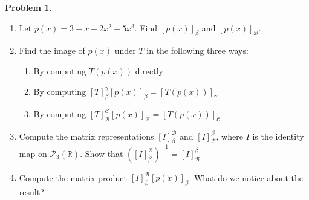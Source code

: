 \documentclass[10pt]{article}
\theoremstyle{definition}
\newtheorem{problem}{Problem}
\begin{document}
\begin{problem}
\begin{enumerate}[label=(\alph*)]
$$\begin{pmatrix}
            -2 & 3
          \end{pmatrix},
          \begin{pmatrix}
            1 & 1 \\
            0 & 2
          \end{pmatrix}
          \right\}
          .$$
  \item Let $p(x)=3-x+2x^2-5x^3$. Find $\left[p(x)\right]_\beta$ and $\left[p(x)\right]_\mathcal{B}$.
  \item Find the image of $p(x)$ under $T$ in the following three ways:
        \begin{enumerate}[label=(\roman*)]
          \item By computing $T(p(x))$ directly
          \item By computing $\left[T\right]_\beta^\gamma\left[p(x)\right]_\beta=\left[T(p(x))\right]_\gamma$
          \item By computing $\left[T\right]_\mathcal{B}^\mathcal{C}\left[p(x)\right]_\mathcal{B}=\left[T(p(x))\right]_\mathcal{C}$
        \end{enumerate}
  \item Compute the matrix representations $\left[I\right]_\beta^\mathcal{B}$ and $\left[I\right]^\beta_\mathcal{B}$, where $I$ is the identity map
        on $\mathcal{P}_3\left(\mathbb{R}\right)$. Show that $\left(\left[I\right]_\beta^\mathcal{B}\right)^{-1}=\left[I\right]^\beta_\mathcal{B}$
  \item Compute the matrix product $\left[I\right]_\beta^\mathcal{B}\left[p(x)\right]_\beta$. What do we notice about the result?
\end{enumerate}
\end{problem}
\newpage
\end{document}
